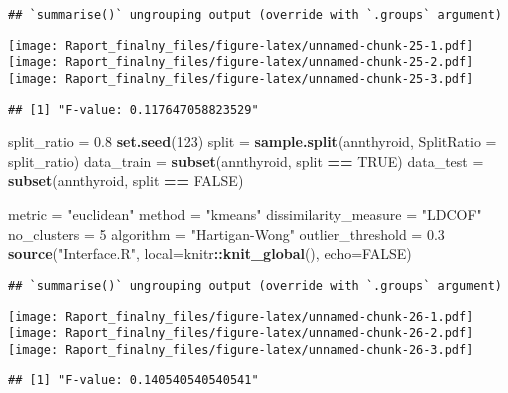 \documentclass[
]{article}
\newenvironment{Shaded}{\begin{snugshade}}{\end{snugshade}}
\newcommand{\DataTypeTok}[1]{\textcolor[rgb]{0.13,0.29,0.53}{#1}}
\newcommand{\DecValTok}[1]{\textcolor[rgb]{0.00,0.00,0.81}{#1}}
\newcommand{\FloatTok}[1]{\textcolor[rgb]{0.00,0.00,0.81}{#1}}
\newcommand{\KeywordTok}[1]{\textcolor[rgb]{0.13,0.29,0.53}{\textbf{#1}}}
\newcommand{\NormalTok}[1]{#1}
\newcommand{\OperatorTok}[1]{\textcolor[rgb]{0.81,0.36,0.00}{\textbf{#1}}}
\newcommand{\OtherTok}[1]{\textcolor[rgb]{0.56,0.35,0.01}{#1}}
\newcommand{\StringTok}[1]{\textcolor[rgb]{0.31,0.60,0.02}{#1}}
\begin{document}
\begin{verbatim}
## `summarise()` ungrouping output (override with `.groups` argument)
\end{verbatim}

\texttt{[image: Raport\_finalny\_files/figure-latex/unnamed-chunk-25-1.pdf]}
\texttt{[image: Raport\_finalny\_files/figure-latex/unnamed-chunk-25-2.pdf]}
\texttt{[image: Raport\_finalny\_files/figure-latex/unnamed-chunk-25-3.pdf]}

\begin{verbatim}
## [1] "F-value: 0.117647058823529"
\end{verbatim}

\begin{Shaded}
\begin{Highlighting}[]
\NormalTok{split_ratio =}\StringTok{ }\FloatTok{0.8}
\KeywordTok{set.seed}\NormalTok{(}\DecValTok{123}\NormalTok{)}
\NormalTok{split =}\StringTok{ }\KeywordTok{sample.split}\NormalTok{(annthyroid, }\DataTypeTok{SplitRatio =}\NormalTok{ split_ratio)}
\NormalTok{data_train =}\StringTok{ }\KeywordTok{subset}\NormalTok{(annthyroid, split }\OperatorTok{==}\StringTok{ }\OtherTok{TRUE}\NormalTok{)}
\NormalTok{data_test =}\StringTok{ }\KeywordTok{subset}\NormalTok{(annthyroid, split }\OperatorTok{==}\StringTok{ }\OtherTok{FALSE}\NormalTok{)}

\NormalTok{metric =}\StringTok{ "euclidean"}
\NormalTok{method =}\StringTok{ "kmeans"}
\NormalTok{dissimilarity_measure =}\StringTok{ "LDCOF"}
\NormalTok{no_clusters =}\StringTok{ }\DecValTok{5}
\NormalTok{algorithm =}\StringTok{ "Hartigan-Wong"}
\NormalTok{outlier_threshold =}\StringTok{ }\FloatTok{0.3}
\KeywordTok{source}\NormalTok{(}\StringTok{"Interface.R"}\NormalTok{, }\DataTypeTok{local=}\NormalTok{knitr}\OperatorTok{::}\KeywordTok{knit_global}\NormalTok{(), }\DataTypeTok{echo=}\OtherTok{FALSE}\NormalTok{)}
\end{Highlighting}
\end{Shaded}

\begin{verbatim}
## `summarise()` ungrouping output (override with `.groups` argument)
\end{verbatim}

\texttt{[image: Raport\_finalny\_files/figure-latex/unnamed-chunk-26-1.pdf]}
\texttt{[image: Raport\_finalny\_files/figure-latex/unnamed-chunk-26-2.pdf]}
\texttt{[image: Raport\_finalny\_files/figure-latex/unnamed-chunk-26-3.pdf]}

\begin{verbatim}
## [1] "F-value: 0.140540540540541"
\end{verbatim}
\end{document}
